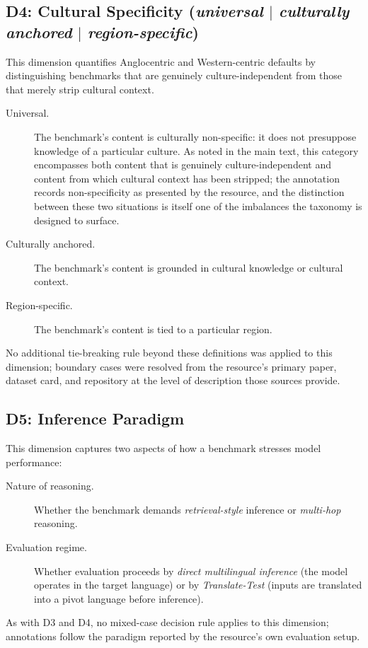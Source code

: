 \documentclass[letterpaper]{article}
\begin{document}
\subsection{D4: Cultural Specificity (\emph{universal} $|$ \emph{culturally anchored} $|$ \emph{region-specific})}
This dimension quantifies Anglocentric and Western-centric defaults by distinguishing benchmarks that are genuinely culture-independent from those that merely strip cultural context.
\begin{description}
\item[Universal.] The benchmark's content is culturally non-specific: it does not presuppose knowledge of a particular culture. As noted in the main text, this category encompasses both content that is genuinely culture-independent and content from which cultural context has been stripped; the annotation records non-specificity as presented by the resource, and the distinction between these two situations is itself one of the imbalances the taxonomy is designed to surface.
\item[Culturally anchored.] The benchmark's content is grounded in cultural knowledge or cultural context.
\item[Region-specific.] The benchmark's content is tied to a particular region.
\end{description}
No additional tie-breaking rule beyond these definitions was applied to this dimension; boundary cases were resolved from the resource's primary paper, dataset card, and repository at the level of description those sources provide.

\subsection{D5: Inference Paradigm}
This dimension captures two aspects of how a benchmark stresses model performance:
\begin{description}
\item[Nature of reasoning.] Whether the benchmark demands \emph{retrieval-style} inference or \emph{multi-hop} reasoning.
\item[Evaluation regime.] Whether evaluation proceeds by \emph{direct multilingual inference} (the model operates in the target language) or by \emph{Translate-Test} (inputs are translated into a pivot language before inference).
\end{description}
As with D3 and D4, no mixed-case decision rule applies to this dimension; annotations follow the paradigm reported by the resource's own evaluation setup.
\end{document}
